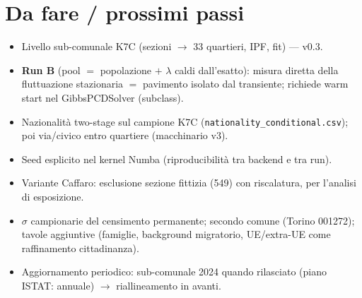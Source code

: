 \documentclass[11pt,a4paper]{article}
\newcommand{\code}[1]{\texttt{#1}}
\begin{document}
\section{Da fare / prossimi passi}
\begin{itemize}[leftmargin=*,itemsep=1pt]
  \item[$\boxtimes$] Livello sub-comunale K7C (sezioni $\to$ 33 quartieri,
  IPF, fit) --- v0.3.
  \item[$\square$] \textbf{Run B} (pool $=$ popolazione $+$ $\lambda$ caldi
  dall'esatto): misura diretta della fluttuazione stazionaria $=$ pavimento
  isolato dal transiente; richiede warm start nel GibbsPCDSolver (subclass).
  \item[$\square$] Nazionalit\`a two-stage sul campione K7C
  (\code{nationality\_conditional.csv}); poi via/civico entro quartiere
  (macchinario v3).
  \item[$\square$] Seed esplicito nel kernel Numba (riproducibilit\`a tra
  backend e tra run).
  \item[$\square$] Variante Caffaro: esclusione sezione fittizia (549) con
  riscalatura, per l'analisi di esposizione.
  \item[$\square$] $\sigma$ campionarie del censimento permanente; secondo
  comune (Torino 001272); tavole aggiuntive (famiglie, background
  migratorio, UE/extra-UE come raffinamento cittadinanza).
  \item[$\square$] Aggiornamento periodico: sub-comunale 2024 quando
  rilasciato (piano ISTAT: annuale) $\to$ riallineamento in avanti.
\end{itemize}
\end{document}
